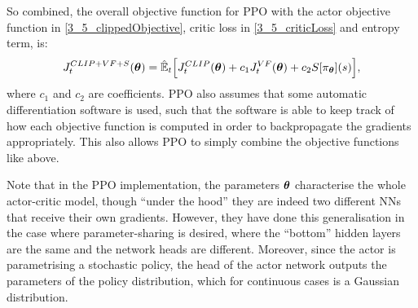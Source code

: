 So combined, the overall objective function for PPO with the actor objective function in \eqref{3_5_clippedObjective}, critic loss in \eqref{3_5_criticLoss} and entropy term, is:
\begin{equation}
    J_t^{CLIP+VF+S}(\boldsymbol{\theta}) = \hat{\mathbb{E}}_t \Big[
    J_t^{CLIP}(\boldsymbol{\theta}) + c_1 J_t^{VF}(\boldsymbol{\theta}) + c_2 S[\pi_{\boldsymbol{\theta}}](s)
    \Big],   \label{3_5_objectiveFull}
\end{equation}
where $c_1$ and $c_2$ are coefficients. PPO also assumes that some automatic differentiation software is used, such that the software is able to keep track of how each objective function is computed in order to backpropagate the gradients appropriately. This also allows PPO to simply combine the objective functions like above.

Note that in the PPO implementation, the parameters $\boldsymbol{\theta}$ characterise the whole actor-critic model, though ``under the hood'' they are indeed two different NNs that receive their own gradients. However, they have done this generalisation in the case where parameter-sharing is desired, where the ``bottom'' hidden layers are the same and the network heads are different. Moreover, since the actor is parametrising a stochastic policy, the head of the actor network outputs the parameters of the policy distribution, which for continuous cases is a Gaussian distribution.

